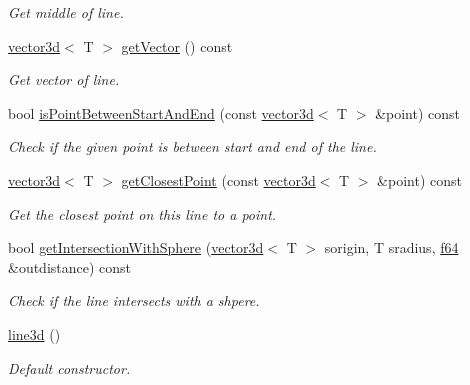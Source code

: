 \begin{DoxyCompactItemize}
\begin{DoxyCompactList}\small\item\em Get middle of line. \end{DoxyCompactList}\item 
\hyperlink{classirr_1_1core_1_1vector3d}{vector3d}$<$ T $>$ \hyperlink{classirr_1_1core_1_1line3d_a8df2350580b6be884b6f6d48c8932795}{get\+Vector} () const
\begin{DoxyCompactList}\small\item\em Get vector of line. \end{DoxyCompactList}\item 
bool \hyperlink{classirr_1_1core_1_1line3d_abe1e874f2058e965bc52802c41672fbc}{is\+Point\+Between\+Start\+And\+End} (const \hyperlink{classirr_1_1core_1_1vector3d}{vector3d}$<$ T $>$ \&point) const
\begin{DoxyCompactList}\small\item\em Check if the given point is between start and end of the line. \end{DoxyCompactList}\item 
\hyperlink{classirr_1_1core_1_1vector3d}{vector3d}$<$ T $>$ \hyperlink{classirr_1_1core_1_1line3d_a40fefd94d9fe0d206eb46e6db52826dc}{get\+Closest\+Point} (const \hyperlink{classirr_1_1core_1_1vector3d}{vector3d}$<$ T $>$ \&point) const
\begin{DoxyCompactList}\small\item\em Get the closest point on this line to a point. \end{DoxyCompactList}\item 
bool \hyperlink{classirr_1_1core_1_1line3d_a1315915ed1b1fb8a11eb8b561be193a0}{get\+Intersection\+With\+Sphere} (\hyperlink{classirr_1_1core_1_1vector3d}{vector3d}$<$ T $>$ sorigin, T sradius, \hyperlink{namespaceirr_a1325b02603ad449f92c68fc640af9b28}{f64} \&outdistance) const
\begin{DoxyCompactList}\small\item\em Check if the line intersects with a shpere. \end{DoxyCompactList}\item 
\hyperlink{classirr_1_1core_1_1line3d_ab88640572a102a9eebd1bf483b7d7e75}{line3d} ()
\begin{DoxyCompactList}\small\item\em Default constructor. \end{DoxyCompactList}\item 
\mbox{\label{classirr_1_1core_1_1line3d_a19bc6c5661d8913ac6911b2513f7804f}} 

\end{DoxyCompactItemize}
